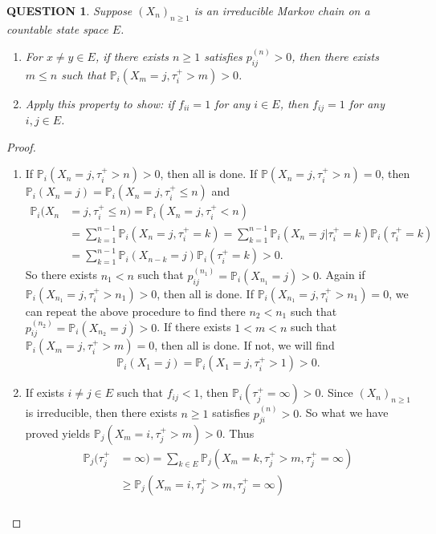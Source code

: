\documentclass[12pt]{article}
\renewcommand{\(}{\left(}%
\renewcommand{\)}{\right)}%
\renewcommand{\[}{\left[}%
\renewcommand{\]}{\right]}%
\newcommand{\p}{\mathbb{P}}
\newtheorem{question}{QUESTION}[section]}
\newtheorem{proof}{Proof.}}
\begin{document}
  \begin{question}
  	Suppose $(X_n)_{n\geq 1}$ is an irreducible Markov chain on a countable state space $E$. 
  	\begin{enumerate}
  		\item For $x\neq y\in E$, if there exists $n\geq 1$ satisfies $p_{ij}^{(n)}>0$, then there exists $m\leq n$ such that $\p_i(X_m=j,\tau_i^+>m)>0$. 
  		\item Apply this property to show: if $f_{ii}=1$ for any $i\in E$, then $f_{ij}=1$ for any $i,j\in E$.
  	\end{enumerate}
  \end{question}
  \begin{proof}
  	\begin{enumerate}
  		\item If $\p_i(X_n=j,\tau_i^+>n)>0$, then all is done. If $\p(X_n=j,\tau_i^+>n)=0$, then $\p_i(X_n=j)=\p_i(X_n=j,\tau_i^+\leq n)$ and
  		\begin{equation*}
  			\begin{split}
  				\p_i(X_n&=j,\tau_i^+\leq n)=\p_i(X_n=j,\tau_i^+< n)\\
  				&=\sum_{k=1}^{n-1}\p_i(X_n=j,\tau_i^+= k)=\sum_{k=1}^{n-1}\p_i(X_n=j|\tau_i^+= k)\p_i(\tau_i^+= k)\\
  				&=\sum_{k=1}^{n-1}\p_i(X_{n-k}=j)\p_i(\tau_i^+= k)>0.
  			\end{split}
  		\end{equation*}
  		So there exists $n_1< n$ such that $p_{ij}^{(n_1)}=\p_i(X_{n_1}=j)>0$. Again if $\p_i(X_{n_1}=j,\tau_i^+>n_1)>0$, then all is done. If $\p_i(X_{n_1}=j,\tau_i^+>n_1)=0$, we can repeat the above procedure to find there $n_2< n_1$ such that $p_{ij}^{(n_2)}=\p_i(X_{n_2}=j)>0$. If there exists $1<m<n$ such that $\p_i(X_{m}=j,\tau_i^+>m)=0$, then all is done. If not, we will find 
  		\begin{equation*}
  			\p_i(X_1=j)=\p_i(X_1=j,\tau_i^+>1)>0.
  		\end{equation*}
  		\item  If exists $i\neq j\in E$ such that $f_{ij}<1$, then $\p_i(\tau_j^+=\infty)>0$. Since $(X_n)_{n\geq 1}$ is irreducible, then there exists $n\geq 1$ satisfies $p_{ji}^{(n)}>0$. So what we have proved yields $\p_j(X_m=i,\tau_j^+>m)>0$. Thus
  		\begin{equation*}
  			\begin{split}
  				\p_j(\tau_j^+&=\infty)=\sum_{k\in E}\p_j(X_m=k,\tau_j^+>m,\tau_j^+=\infty)\\
  				&\geq \p_j(X_m=i,\tau_j^+>m,\tau_j^+=\infty)\\

\end{split}
\end{equation*}
\end{enumerate}
\end{proof}
\end{document}
